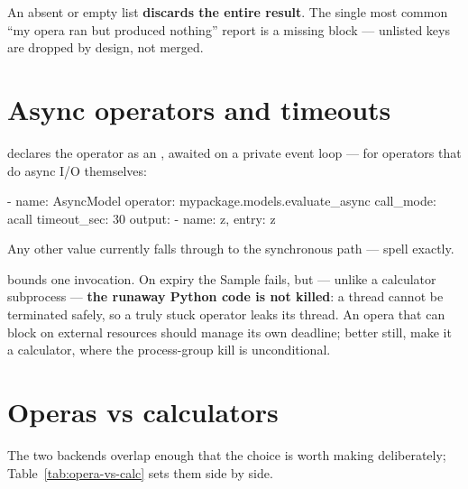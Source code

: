 \begin{jwarn}
An absent or empty  list \textbf{discards the entire result}. The single
most common ``my opera ran but produced nothing'' report is a missing 
block --- unlisted keys are dropped by design, not merged.
\end{jwarn}

\section{Async operators and timeouts}
\label{sec:opera-failure}

 declares the operator as an , awaited on a
private event loop --- for operators that do async I/O themselves:

\begin{yamlwin}
- name: AsyncModel
  operator: mypackage.models.evaluate_async
  call_mode: acall
  timeout_sec: 30
  output:
    - {name: z, entry: z}
\end{yamlwin}

Any other  value currently falls through to the synchronous path ---
spell  exactly.

 bounds one invocation. On expiry the Sample fails, but ---
unlike a calculator subprocess --- \textbf{the runaway Python code is not killed}: a
thread cannot be terminated safely, so a truly stuck operator leaks its thread. An opera
that can block on external resources should manage its own deadline; better still, make
it a calculator, where the process-group kill is unconditional.

\section{Operas vs calculators}
\label{sec:opera-vs-calc}

The two backends overlap enough that the choice is worth making deliberately;
Table~\ref{tab:opera-vs-calc} sets them side by side.


